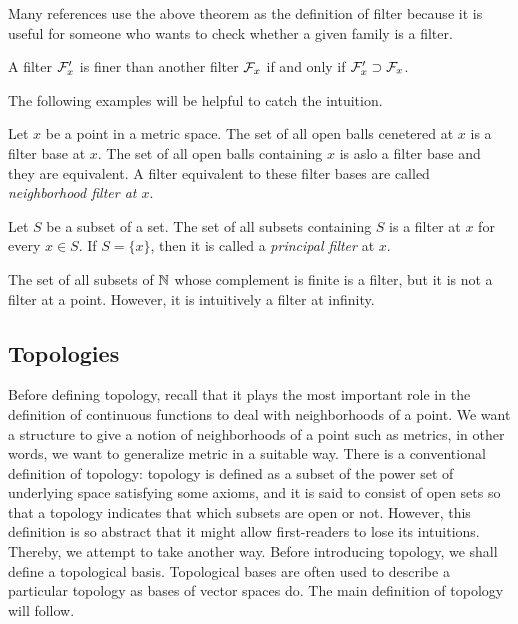 \documentclass{../crs}
\begin{document}
Many references use the above theorem as the definition of filter because it is useful for someone who wants to check whether a given family is a filter.

\begin{thm}
A filter $\mathcal{F}'_x$ is finer than another filter $\mathcal{F}_x$ if and only if $\mathcal{F}'_x\supset\mathcal{F}_x$.
\end{thm}
\begin{pf}
\end{pf}

The following examples will be helpful to catch the intuition.

\begin{ex}
Let $x$ be a point in a metric space.
The set of all open balls cenetered at $x$ is a filter base at $x$.
The set of all open balls containing $x$ is aslo a filter base and they are equivalent.
A filter equivalent to these filter bases are called \emph{neighborhood filter at $x$}.
\end{ex}
\begin{ex}
Let $S$ be a subset of a set.
The set of all subsets containing $S$ is a filter at $x$ for every $x\in S$.
If $S=\{x\}$, then it is called a \emph{principal filter} at $x$.
\end{ex}
\begin{ex}
The set of all subsets of $\mathbb{N}$ whose complement is finite is a filter, but it is not a filter at a point.
However, it is intuitively a filter at infinity.
\end{ex}









\subsection{Topologies}
Before defining topology, recall that it plays the most important role in the definition of continuous functions to deal with neighborhoods of a point.
We want a structure to give a notion of neighborhoods of a point such as metrics, in other words, we want to generalize metric in a suitable way.
There is a conventional definition of topology: topology is defined as a subset of the power set of underlying space satisfying some axioms, and it is said to consist of open sets so that a topology indicates that which subsets are open or not.
However, this definition is so abstract that it might allow first-readers to lose its intuitions.
Thereby, we attempt to take another way.
Before introducing topology, we shall define a topological basis.
Topological bases are often used to describe a particular topology as bases of vector spaces do.
The main definition of topology will follow.
\end{document}

